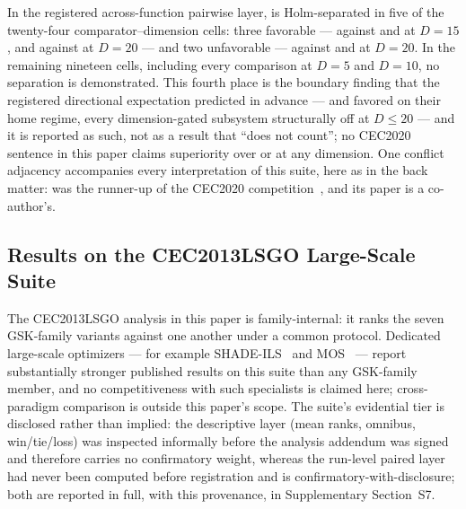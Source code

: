 In the registered across-function pairwise layer, \dtgsk{} is
Holm-separated in five of the twenty-four comparator--dimension cells:
three favorable --- against \atmals{} and \egsk{} at $D = 15$, and
against \egsk{} at $D = 20$ --- and two unfavorable --- against \agsk{}
and \fdbagsk{} at $D = 20$. In the remaining nineteen cells, including
every comparison at $D = 5$ and $D = 10$, no separation is demonstrated.
This fourth place is the boundary finding that the registered directional
expectation predicted in advance --- \agsk{} and \apgsk{} favored on
their home regime, every dimension-gated \dtgsk{} subsystem structurally
off at $D \leq 20$ --- and it is reported as such, not as a result that
``does not count''; no CEC2020 sentence in this paper claims superiority
over \agsk{} or \fdbagsk{} at any dimension.
One conflict adjacency accompanies every interpretation of this suite,
here as in the back matter: \agsk{} was the runner-up of the CEC2020
competition~\cite{apgsk2021}, and its paper is a co-author's.

\subsection{Results on the CEC2013LSGO Large-Scale Suite}\label{sec:exp:cec2013lsgo}

The CEC2013LSGO analysis in this paper is family-internal: it ranks the
seven GSK-family variants against one another under a common protocol.
Dedicated large-scale optimizers --- for example
SHADE-ILS~\cite{molina2018shadeils} and MOS~\cite{latorre2013mos} ---
report substantially stronger published results on this suite than any
GSK-family member, and no competitiveness with such specialists is
claimed here; cross-paradigm comparison is outside this paper's scope.
The suite's evidential tier is disclosed rather than implied: the
descriptive layer (mean ranks, omnibus, win/tie/loss) was inspected
informally before the analysis addendum was signed and therefore carries
no confirmatory weight, whereas the run-level paired layer had never
been computed before registration and is confirmatory-with-disclosure;
both are reported in full, with this provenance, in Supplementary
Section~S7.

